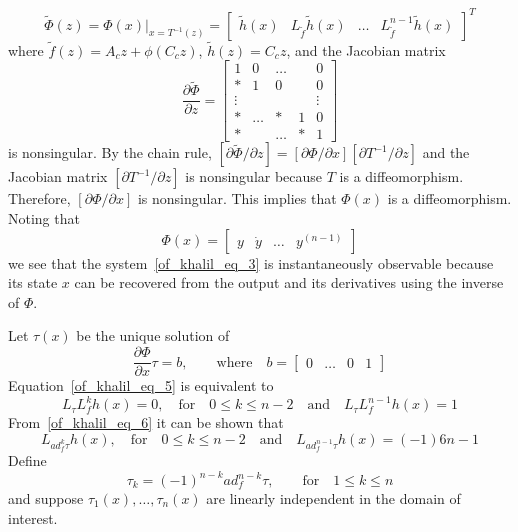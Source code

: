 \documentclass[12pt,a4paper,oneside]{book}
\begin{document}
\begin{onehalfspace}
\begin{equation*}
	\tilde{\Phi}(z)=\Phi(x)\Bigg|_{x=T^{-1}(z)}=\begin{bmatrix} \tilde{h}(x) &L_{\tilde{f}}\tilde{h}(x) & \dots &L_{\tilde{f}}^{n-1}\tilde{h}(x) \end{bmatrix}^T
\end{equation*}
where $\tilde{f}(z)=A_cz+\phi(C_cz)$, $\tilde{h}(z)=C_cz$, and the Jacobian matrix
\begin{equation*}
	\frac{\partial \tilde{\Phi}}{\partial z}=\begin{bmatrix} 1&0&\dots& &0 \\[6pt] * & 1 & 0 & & 0 \\[6pt] \vdots& & & & \vdots \\[6pt] *&\dots& * & 1 & 0 \\[6pt] *& & \dots&*&1 \end{bmatrix}
\end{equation*}
is nonsingular. By the chain rule, $[\partial\tilde{\Phi}/\partial z]=[\partial \Phi/\partial x][\partial T^{-1}/\partial z]$ and the Jacobian matrix $[\partial T^{-1}/\partial z]$ is nonsingular because $T$ is a diffeomorphism. Therefore, $[\partial \Phi/\partial x]$ is nonsingular. This implies that $\Phi(x)$ is a diffeomorphism. Noting that
\begin{equation*}
	\Phi(x) = \begin{bmatrix} y&\dot{y} & \dots & y^{(n-1)} \end{bmatrix}
\end{equation*}
we see that the system~\eqref{of_khalil_eq_3} is instantaneously observable because its state $x$ can be recovered from the output and its derivatives using the inverse of $\Phi$.

Let $\tau(x)$ be the unique solution of
\begin{equation}\label{of_khalil_eq_5}
	\frac{\partial \Phi}{\partial x}\tau=b,\qquad \text{where}\quad b=\begin{bmatrix}0&\dots&0&1 \end{bmatrix}
\end{equation}
Equation~\eqref{of_khalil_eq_5} is equivalent to
\begin{equation}\label{of_khalil_eq_6}
	L_{\tau}L_f^kh(x)=0,\quad\text{for}\quad0\le k\le n-2\quad\text{and}\quad L_{\tau}L_f^{n-1}h(x)=1
\end{equation}
From~\eqref{of_khalil_eq_6} it can be shown that 
\begin{equation}\label{of_khalil_eq_7}
	L_{ad_f^k\tau}h(x),\quad\text{for}\quad0\le k\le n-2\quad\text{and}\quad L_{ad_f^{n-1}\tau}h(x)=(-1)6{n-1}
\end{equation}
Define
\begin{equation}
	\tau_k=(-1)^{n-k}ad_f^{n-k}\tau,\qquad\text{for}\quad1\le k\le n
\end{equation}
and suppose $\tau_1(x),\dots,\tau_n(x)$ are linearly independent in the domain of interest. 


\end{onehalfspace}
\end{document}
